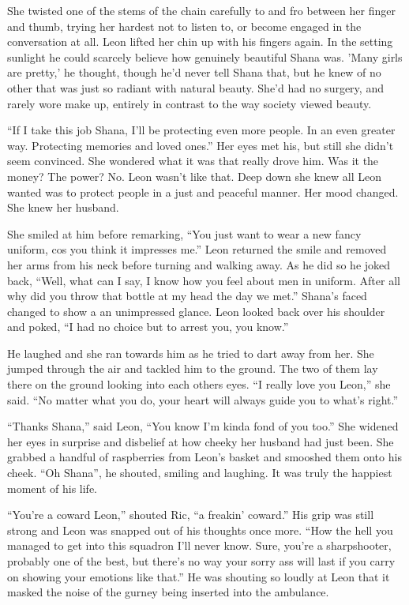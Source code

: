 She twisted one of the stems of the chain carefully to and fro between her finger and thumb, trying her hardest not to listen to, or become engaged in the conversation at all.  Leon lifted her chin up with his fingers again.  In the setting sunlight he could scarcely believe how genuinely beautiful Shana was.  'Many girls are pretty,' he thought, though he'd never tell Shana that, but he knew of no other that was just so radiant with natural beauty.  She'd had no surgery, and rarely wore make up, entirely in contrast to the way society viewed beauty.

``If I take this job Shana, I'll be protecting even more people.  In an even greater way.  Protecting memories and loved ones.''  Her eyes met his, but still she didn't seem convinced.  She wondered what it was that really drove him.  Was it the money?  The power?  No.  Leon wasn't like that.  Deep down she knew all Leon wanted was to protect people in a just and peaceful manner.  Her mood changed.  She knew her husband.  

She smiled at him before remarking, ``You just want to wear a new fancy uniform, cos you think it impresses me.''  Leon returned the smile and removed her arms from his neck before turning and walking away.  As he did so he joked back, ``Well, what can I say, I know how you feel about men in uniform.  After all why did you throw that bottle at my head the day we met.''  Shana's faced changed  to show a an unimpressed glance.  Leon looked back over his shoulder and poked, ``I had no choice but to arrest you, you know.''  

He laughed and she ran towards him as he tried to dart away from her.  She jumped through the air and tackled him to the ground.  The two of them lay there on the ground looking into each others eyes.  ``I really love you Leon,'' she said.  ``No matter what you do, your heart will always guide you to what's right.''

``Thanks Shana,'' said Leon, ``You know I'm kinda fond of you too.''  She widened her eyes in surprise and disbelief at how cheeky her husband had just been.  She grabbed a handful of raspberries from Leon's basket and smooshed them onto his cheek. ``Oh Shana'', he shouted, smiling and laughing.  It was truly the happiest moment of his life.



\thoughtbreak



``You're a coward Leon,'' shouted Ric, ``a freakin' coward.''  His grip was still strong and Leon was snapped out of his thoughts once more.  ``How the hell you managed to get into this squadron I'll never know.  Sure, you're a sharpshooter, probably one of the best, but there's no way your sorry ass will last if you carry on showing your emotions like that.''  He was shouting so loudly at Leon that it masked the noise of the gurney being inserted into the ambulance.

